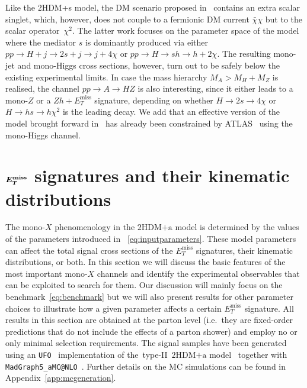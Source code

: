 \documentclass[a4paper, 11pt,notoc]{article}
\newcommand{\MET}{\ensuremath{E_T^\mathrm{miss}}\xspace}
\newcommand{\hdma}{\ensuremath{\textrm{2HDM+a}}\xspace}
\def\bm#1{\mbox{\boldmath$#1$\unboldmath}}
\begin{document}
 Like the 2HDM+s model, the DM scenario proposed in~\cite{vonBuddenbrock:2016rmr} contains an extra scalar singlet, which, however, does not couple to a fermionic DM current $\bar \chi \chi$ but to the scalar operator~$\chi^2$. The latter work focuses on the parameter space of the model where the mediator $s$ is dominantly produced via either  $pp \to H + j \to 2s + j \to j + 4 \chi$ or $pp \to H \to sh \to h + 2\chi$. The resulting mono-jet and mono-Higgs cross sections, however, turn out to be safely below the existing experimental limits. In case the mass hierarchy  $M_A > M_H + M_Z$ is realised, the channel $pp \to A \to HZ$ is also interesting, since it either leads to a mono-$Z$ or a $Zh+\MET$ signature, depending on whether $H \to 2 s \to 4 \chi$ or $H \to h s \to h \chi^2$ is the leading decay. We add that an effective version of the model brought forward in~\cite{vonBuddenbrock:2016rmr}  has already been constrained by ATLAS~\cite{Aaboud:2017uak} using the mono-Higgs channel.  


\section{$\bm{E_T^{\rm miss}}$ signatures and their kinematic distributions}
\label{sec:experimentbasics}

The mono-$X$ phenomenology in the  \hdma model is determined by the values of the parameters introduced in ~\eqref{eq:inputparameters}. These model parameters can affect the total signal cross sections of the $\MET$ signatures, their kinematic distributions, or both. In this section we will discuss the basic features of the most important mono-$X$ channels and identify the experimental observables that can be exploited to search for them. Our discussion will  mainly focus on the benchmark~\eqref{eq:benchmark} but we will also present results for other parameter choices to illustrate how a given parameter affects a certain $\MET$ signature.  All results in this section are obtained at the parton level (i.e.~they are fixed-order predictions that do not include the effects of a parton shower) and employ no or only minimal selection requirements. The signal samples have been generated using an {\tt UFO}~\cite{Degrande:2011ua} implementation of the~type-II~\hdma model~\cite{hdmaUFO} together with {\tt MadGraph5\_aMC@NLO}~\cite{Alwall:2014hca}. Further details on the MC simulations can be found in Appendix~\ref{app:mcgeneration}.
\end{document}
